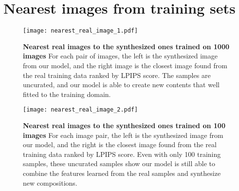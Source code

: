 \documentclass{article} \usepackage{iclr2021_conference,times}
\begin{document}
\clearpage

\section{Nearest images from training sets}

\begin{figure}[h]
\vspace{-2mm}
\centering
\texttt{[image: nearest\_real\_image\_1.pdf]}
\caption{\textbf{Nearest real images to the synthesized ones trained on 1000 images} For each pair of images, the left is the synthesized image from our model, and the right image is the closest image found from the real training data ranked by LPIPS score. The samples are uncurated, and our model is able to create new contents that well fitted to the training domain.}
\label{fig:nr_1}
\end{figure}
\clearpage

\begin{figure}[h]
\vspace{-2mm}
\centering
\texttt{[image: nearest\_real\_image\_2.pdf]}
\caption{\textbf{Nearest real images to the synthesized ones trained on 100 images} For each image pair, the left is the synthesized image from our model, and the right is the closest image found from the real training data ranked by LPIPS score. Even with only 100 training samples, these uncurated samples show our model is still able to combine the features learned from the real samples and synthesize new compositions.}
\label{fig:nr_1}
\end{figure}
\clearpage

\begin{table}[h]
\caption{LPIPS between synthetic images and their closest real images.}
\label{table:nn_lpips}
\begin{center}
\end{center}
\end{table}
\end{document}
